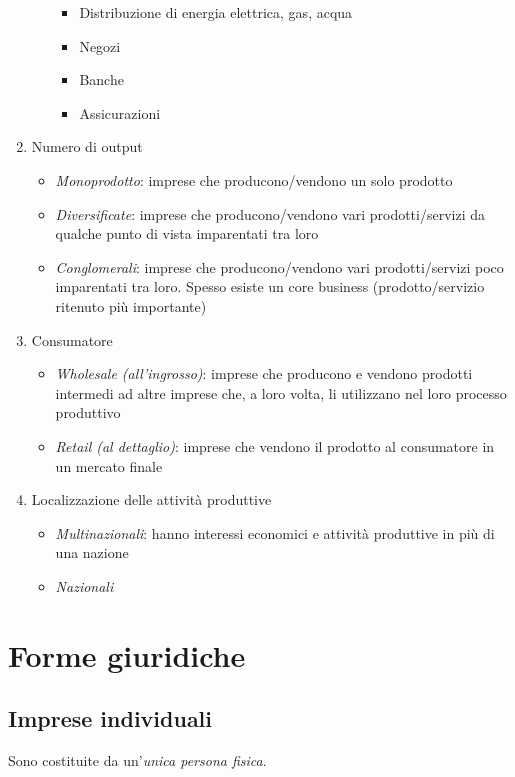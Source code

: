 \documentclass[10pt,a4paper,fleqn,oneside]{book}
\begin{document}
\begin{enumerate}
\begin{itemize}
\begin{itemize}
            \item Distribuzione di energia elettrica, gas, acqua
            \item Negozi
            \item Banche
            \item Assicurazioni
        \end{itemize}
    \end{itemize}
    \item Numero di output
    \begin{itemize}
        \item \emph{Monoprodotto}: imprese che producono/vendono un solo prodotto
        \item \emph{Diversificate}: imprese che producono/vendono vari prodotti/servizi
        da qualche punto di vista imparentati tra loro
        \item \emph{Conglomerali}: imprese che producono/vendono vari prodotti/servizi
        poco imparentati tra loro. Spesso esiste un core business
        (prodotto/servizio ritenuto più importante)
    \end{itemize}
    \item Consumatore
    \begin{itemize}
        \item \emph{Wholesale (all’ingrosso)}: imprese che producono e vendono prodotti
        intermedi ad altre imprese che, a loro volta, li utilizzano nel loro processo
        produttivo
        \item \emph{Retail (al dettaglio)}: imprese che vendono il prodotto al consumatore in
        un mercato finale
    \end{itemize}
    \item Localizzazione delle attività produttive
    \begin{itemize}
        \item \emph{Multinazionali}: hanno interessi economici e attività produttive in più di
        una nazione
        \item \emph{Nazionali}
    \end{itemize}
\end{enumerate}

\section{Forme giuridiche}

\subsection{Imprese individuali}
Sono costituite da un'\emph{unica persona fisica}.
\end{document}
